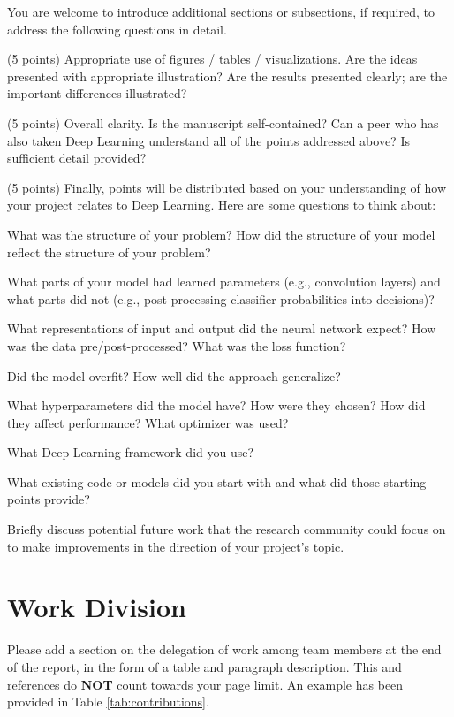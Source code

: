 \documentclass[10pt,twocolumn,letterpaper]{article}
\begin{document}
You are welcome to introduce additional sections or subsections, if required, to address the following questions in detail. 

(5 points) Appropriate use of figures / tables / visualizations. Are the ideas presented with appropriate illustration? Are the results presented clearly; are the important differences illustrated? 

(5 points) Overall clarity. Is the manuscript self-contained? Can a peer who has also taken Deep Learning understand all of the points addressed above? Is sufficient detail provided? 

(5 points) Finally, points will be distributed based on your understanding of how your project relates to Deep Learning. Here are some questions to think about: 

What was the structure of your problem? How did the structure of your model reflect the structure of your problem? 

What parts of your model had learned parameters (e.g., convolution layers) and what parts did not (e.g., post-processing classifier probabilities into decisions)? 

What representations of input and output did the neural network expect? How was the data pre/post-processed?
What was the loss function? 

Did the model overfit? How well did the approach generalize? 

What hyperparameters did the model have? How were they chosen? How did they affect performance? What optimizer was used? 

What Deep Learning framework did you use? 

What existing code or models did you start with and what did those starting points provide? 

Briefly discuss potential future work that the research community could focus on to make improvements in the direction of your project's topic.



\section{Work Division}

Please add a section on the delegation of work among team members at the end of the report, in the form of a table and paragraph description. This and references do \textbf{NOT} count towards your page limit. An example has been provided in Table \ref{tab:contributions}.
\end{document}
